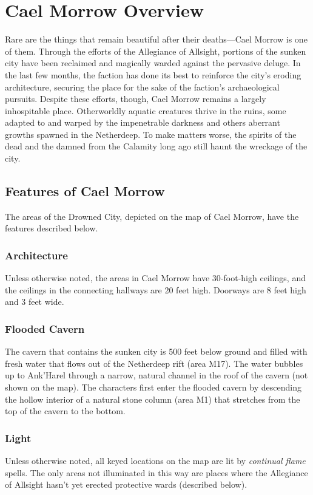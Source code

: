 \documentclass[10pt,a4,twoside,twocolumn,openany,nodeprecatedcode]{dndbook}
\begin{document}
\section{Cael Morrow Overview}
Rare are the things that remain beautiful after their deaths—Cael Morrow is one of them. Through the efforts of the Allegiance of Allsight, portions of the sunken city have been reclaimed and magically warded against the pervasive deluge. In the last few months, the faction has done its best to reinforce the city's eroding architecture, securing the place for the sake of the faction's archaeological pursuits.
Despite these efforts, though, Cael Morrow remains a largely inhospitable place. Otherworldly aquatic creatures thrive in the ruins, some adapted to and warped by the impenetrable darkness and others aberrant growths spawned in the Netherdeep. To make matters worse, the spirits of the dead and the damned from the Calamity long ago still haunt the wreckage of the city.
\subsection{Features of Cael Morrow}
The areas of the Drowned City, depicted on the map of Cael Morrow, have the features described below.
\subsubsection{Architecture}
Unless otherwise noted, the areas in Cael Morrow have 30-foot-high ceilings, and the ceilings in the connecting hallways are 20 feet high. Doorways are 8 feet high and 3 feet wide.
\subsubsection{Flooded Cavern}
The cavern that contains the sunken city is 500 feet below ground and filled with fresh water that flows out of the Netherdeep rift (area M17). The water bubbles up to Ank'Harel through a narrow, natural channel in the roof of the cavern (not shown on the map).
The characters first enter the flooded cavern by descending the hollow interior of a natural stone column (area M1) that stretches from the top of the cavern to the bottom.
\subsubsection{Light}
Unless otherwise noted, all keyed locations on the map are lit by \textit{continual flame} spells. The only areas not illuminated in this way are places where the Allegiance of Allsight hasn't yet erected protective wards (described below).
\end{document}
